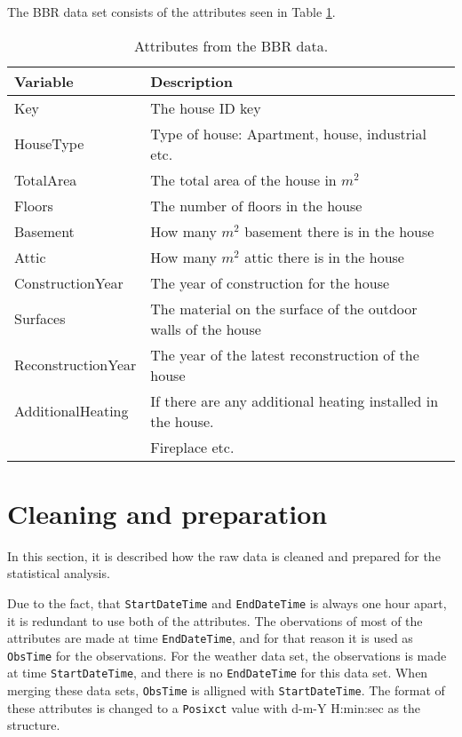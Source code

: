 \noindent The BBR data set consists of the attributes seen in Table \ref{tab: BBR}.
\begin{table}[H]
    \centering
    \begin{tabular}{ll}
     \hline
     \textbf{Variable} & \textbf{Description} \\
    \hline
    \hline
    Key  &  The house ID key\\
    HouseType  &  Type of house: Apartment, house, industrial etc. \\
    TotalArea  & The total area of the house in $m^2$ \\
    Floors  & The number of floors in the house \\
    Basement  & How many $m^2$ basement there is in the house \\
    Attic  & How many $m^2$ attic there is in the house \\
    ConstructionYear  & The year of construction for the house  \\
    Surfaces  & The material on the surface of the outdoor walls of the house \\
    ReconstructionYear  & The year of the latest reconstruction of the house \\
    AdditionalHeating  & If there are any additional heating installed in the house. \\ & Fireplace etc. \\
    \hline
    \end{tabular}
    \caption{Attributes from the BBR data.}
    \label{tab: BBR}
\end{table}   




\section{Cleaning and preparation}
In this section, it is described how the raw data is cleaned and prepared for the statistical analysis. 

\noindent Due to the fact, that \texttt{StartDateTime} and \texttt{EndDateTime} is always one hour apart, it is redundant to use both of the attributes. The obervations of most of the attributes are made at time \texttt{EndDateTime}, and for that reason it is used as \texttt{ObsTime} for the observations. For the weather data set, the observations is made at time \texttt{StartDateTime}, and there is no \texttt{EndDateTime} for this data set. When merging these data sets, \texttt{ObsTime} is alligned with \texttt{StartDateTime}. The format of these attributes is changed to a \texttt{Posixct} value with d-m-Y H:min:sec as the structure.

